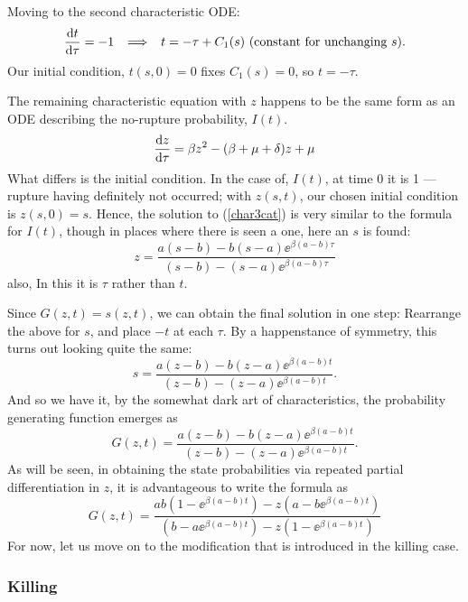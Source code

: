 \noindent
Moving to the second characteristic ODE:
$$\displaystyle\frac{{\rm d} t}{{\rm d} \tau} = -1 \hspace{5pt} \implies \hspace{5pt} t = -\tau +  C_1(s) \text{  (constant for unchanging }s ).$$
Our initial condition, $t(s,0) = 0$ fixes $C_1(s) = 0$, so $t = -\tau$.\par
The remaining characteristic equation with $z$ happens to be the same form as an ODE describing the no-rupture probability, $I(t)$. 
\begin{equation}
\label{char3cat}
\displaystyle\frac{{\rm d} z}{{\rm d} \tau} = \beta z^2 - (\beta + \mu + \delta)z + \mu
\end{equation}
What differs is the initial condition. In the case of, $I(t)$, at time 0 it is 1 --- rupture having definitely not occurred; with $z(s,t)$, our chosen initial condition is $z(s, 0) = s$. Hence, the solution to (\ref{char3cat}) is very similar to the formula for $I(t)$, though in places where there is seen a one, here an $s$ is found:
\begin{equation*}
z = \frac{a(s-b) - b(s-a)\ee^{\beta(a-b) \tau} } {(s-b) - (s-a)\ee^{\beta(a-b) \tau}}
\end{equation*}
also, In this it is $\tau$ rather than $t$.\par
Since $G(z, t) = s(z, t)$, we can obtain the final solution in one step: Rearrange the above for $s$, and place $-t$ at each $\tau$. By a happenstance of symmetry, this turns out looking quite the same:
\begin{equation}
\label{s2343}
s = \frac{a(z-b) - b(z-a)\ee^{\beta(a-b) t} } {(z-b) - (z-a)\ee^{\beta(a-b) t}}.
\end{equation}
And so we have it, by the somewhat dark art of characteristics, the probability generating function emerges as
\begin{equation*}
G(z,t) = \frac{a(z-b) - b(z-a)\ee^{\beta(a-b) t} } {(z-b) - (z-a)\ee^{\beta(a-b) t}}.
\end{equation*}
As will be seen, in obtaining the state probabilities via repeated partial differentiation in $z$, it is advantageous to write the formula as
\begin{equation*}
G(z,t) = \frac{ab(1-\ee^{\beta(a-b) t}) - z(a-b\ee^{\beta(a-b) t}) } {  (b-a\ee^{\beta(a-b) t}) -z(1-\ee^{\beta(a-b) t})  }
\end{equation*}
For now, let us move on to the modification that is introduced in the killing case. 


\subsubsection*{Killing}

